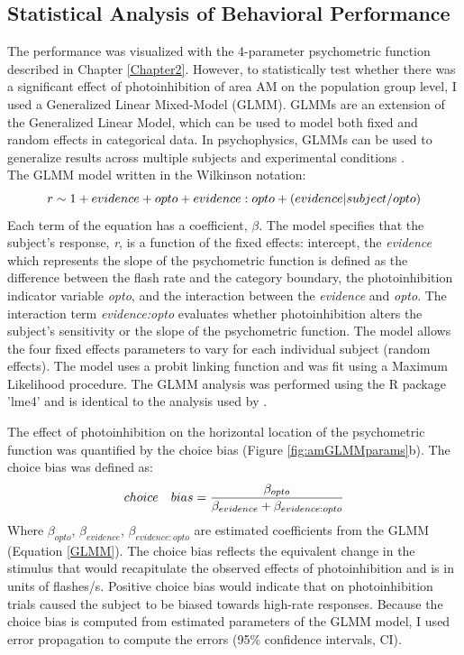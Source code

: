\subsection{Statistical Analysis of Behavioral Performance}
The performance was visualized with the 4-parameter psychometric function described in Chapter \ref{Chapter2}. However, to statistically test whether there was a significant effect of photoinhibition of area AM on the population group level, I used a Generalized Linear Mixed-Model (GLMM). GLMMs are an extension of the Generalized Linear Model, which can be used to model both fixed and random effects in categorical data. In psychophysics, GLMMs can be used to generalize results across multiple subjects and experimental conditions \parencite{KnoblauchMaloney2012,Moscatelli2012a,Erlich2015}. \\The GLMM model written in the Wilkinson notation:
\begin{equation}
	\centering
	r \sim  1 + evidence + opto + evidence:opto + (evidence|subject/opto)
    \label{GLMM}
\end{equation}
Each term of the equation has a coefficient, $\beta$. The model specifies that the subject's response, \emph{r}, is a function of the fixed effects: intercept, the \emph{evidence} which represents the slope of the psychometric function is defined as the difference between the flash rate and the category boundary, the photoinhibition indicator variable \emph{opto}, and the interaction between the \emph{evidence} and \emph{opto}. The interaction term \emph{evidence:opto} evaluates whether photoinhibition alters the subject's sensitivity or the slope of the psychometric function. The model allows the four fixed effects parameters to vary for each individual subject (random effects). The model uses a probit linking function and was fit using a Maximum Likelihood procedure. The GLMM analysis was performed using the R package 'lme4' and is identical to the analysis used by \textcite{Erlich2015}. \par 

The effect of photoinhibition on the horizontal location of the psychometric function was quantified by the choice bias (Figure \ref{fig:amGLMMparams}b). The choice bias was defined as: 
\begin{equation}
	\centering
	choice\quad bias =  \frac{\beta_{opto}}{\beta_{evidence}+\beta_{evidence:opto}}
    \label{choicebias}
\end{equation}
Where $\beta_{opto}$, $\beta_{evidence}$, $\beta_{evidence:opto}$ are estimated coefficients from the GLMM (Equation \ref{GLMM}). The choice bias reflects the equivalent change in the stimulus that would recapitulate the observed effects of photoinhibition and is in units of flashes/s. Positive choice bias would indicate that on photoinhibition trials caused the subject to be biased towards high-rate responses. Because the choice bias is computed from estimated parameters of the GLMM model, I used error propagation to compute the errors (95\% confidence intervals, CI).

